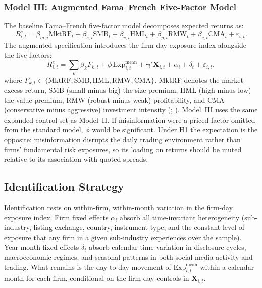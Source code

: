 \documentclass{article}
\theoremstyle{plain}
\begin{document}
\subsubsection{Model III: Augmented Fama--French Five-Factor Model}

The baseline Fama--French five-factor model decomposes expected returns as:
\begin{equation}
R^e_{i,t} = \beta_{m,i}\text{MktRF}_t + \beta_{s,i}\text{SMB}_t + \beta_{v,i}\text{HML}_t + \beta_{p,i}\text{RMW}_t + \beta_{c,i}\text{CMA}_t + \varepsilon_{i,t}.
\label{eq:ff5}
\end{equation}
The augmented specification introduces the firm-day exposure index alongside the five factors:
\begin{equation}
R^e_{i,t} = \sum_{k}\beta_{k}F_{k,t} + \phi\,\mathrm{Exp}^{\text{mean}}_{i,t} + \boldsymbol{\gamma}' \mathbf{X}_{i,t} + \alpha_i + \delta_t + \varepsilon_{i,t},
\label{eq:ff5_aug}
\end{equation}
where $F_{k,t} \in \{\text{MktRF}, \text{SMB}, \text{HML}, \text{RMW}, \text{CMA}\}$. MktRF denotes the market excess return, SMB (small minus big) the size premium, HML (high minus low) the value premium, RMW (robust minus weak) profitability, and CMA (conservative minus aggressive) investment intensity (\cite{fama1993}; \cite{fama2015}). Model~III uses the same expanded control set as Model~II. If misinformation were a priced factor omitted from the standard model, $\phi$ would be significant. Under H1 the expectation is the opposite: misinformation disrupts the daily trading environment rather than firms' fundamental risk exposures, so its loading on returns should be muted relative to its association with quoted spreads.

\subsection{Identification Strategy}

Identification rests on within-firm, within-month variation in the firm-day exposure index. Firm fixed effects $\alpha_i$ absorb all time-invariant heterogeneity (sub-industry, listing exchange, country, instrument type, and the constant level of exposure that any firm in a given sub-industry experiences over the sample). Year-month fixed effects $\delta_t$ absorb calendar-time variation in disclosure cycles, macroeconomic regimes, and seasonal patterns in both social-media activity and trading. What remains is the day-to-day movement of $\mathrm{Exp}^{\text{mean}}_{i,t}$ within a calendar month for each firm, conditional on the firm-day controls in $\mathbf{X}_{i,t}$.
\end{document}
